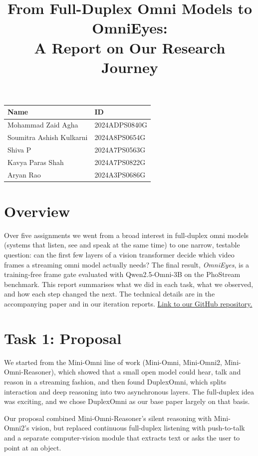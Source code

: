 \documentclass[11pt]{article}
\title{\vspace{-1.2cm}From Full-Duplex Omni Models to OmniEyes:\\ A Report on Our Research Journey}
\date{}
\begin{document}
\maketitle

\begin{table}[h!]
\centering
\begin{tabular}{ll}
\toprule
\textbf{Name} & \textbf{ID} \\
\midrule
Mohammad Zaid Agha & 2024ADPS0840G \\
Soumitra Ashish Kulkarni & 2024A8PS0654G \\
Shiva P & 2024A7PS0563G \\
Kavya Paras Shah & 2024A7PS0822G \\
Aryan Rao & 2024A3PS0686G \\
\bottomrule
\end{tabular}
\end{table}
\vspace{-0.8cm}

\section*{Overview}
Over five assignments we went from a broad interest in full-duplex omni models (systems that listen, see and speak at the same time) to one narrow, testable question: can the first few layers of a vision transformer decide which video frames a streaming omni model actually needs? The final result, \emph{OmniEyes}, is a training-free frame gate evaluated with Qwen2.5-Omni-3B on the PhoStream benchmark. This report summarises what we did in each task, what we observed, and how each step changed the next. The technical details are in the accompanying paper and in our iteration reports.
\newline
\href{https://github.com/SupercalifragilisticexpialidociousPoppy/OmniEyes}{Link to our GitHub repository.}

\section*{Task 1: Proposal}
We started from the Mini-Omni line of work (Mini-Omni, Mini-Omni2, Mini-Omni-Reasoner), which showed that a small open model could hear, talk and reason in a streaming fashion, and then found DuplexOmni, which splits interaction and deep reasoning into two asynchronous layers. The full-duplex idea was exciting, and we chose DuplexOmni as our base paper largely on that basis.

Our proposal combined Mini-Omni-Reasoner's silent reasoning with Mini-Omni2's vision, but replaced continuous full-duplex listening with push-to-talk and a separate computer-vision module that extracts text or asks the user to point at an object.
\end{document}
